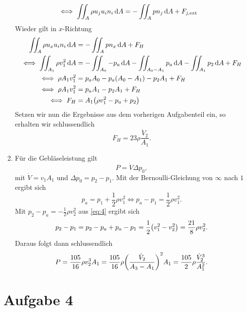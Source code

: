 \documentclass{exercise}
\begin{document}
\begin{enumerate}
\begin{align*}
            \iff \iint_A \rho u_j u_i n_i\mathop{\mathrm{d}\!} A &= -\iint_A pn_j\mathop{\mathrm{d}\!} A + F_{j, \text{ext}}
        \end{align*}
        Wieder gilt in \(x\)-Richtung
        \begin{align*}
            \iint_A \rho u_x u_i n_i\d A &= -\iint_A pn_x\d A + F_H\\
            \iff \iint_{A_1}\rho v_1^2\d A &= -\iint_{A_0}-p_a\d A - \iint_{A_0 - A_1}p_a\d A - \iint_{A_1}p_2\d A + F_H\\
            \iff \rho A_1 v_1^2 &= p_a A_0 - p_a\parentheses*{A_0 - A_1} - p_2 A_1 + F_H\\
            \iff \rho A_1 v_1^2 &= p_a A_1 - p_2 A_1 + F_H\\
            \iff F_H &= A_1\parentheses*{\rho v_1^2 - p_a + p_2}
        \end{align*}
        Setzen wir nun die Ergebnisse aus dem vorherigen Aufgabenteil ein, so erhalten wir schlussendlich
        \[
            F_H = 23\rho\frac{\dot{V}_2}{A_1}.
        \]
        \item Für die Gebläseleistung gilt
        \[
            P = \dot{V}\Delta p_0,
        \]
        mit \(\dot{V} = v_1 A_1\) und \(\Delta p_0 = p_2 - p_1\).
        Mit der Bernoulli-Gleichung von \(\infty\) nach \(1\) ergibt sich
        \[
            p_a = p_1 + \frac{1}{2}\rho v_1^2 \iff p_a - p_1 = \frac{1}{2}\rho v_1^2.
        \]
        Mit \(p_2 - p_a = -\frac{1}{2}\rho v_2^2\) aus \eqref{eq:4} ergibt sich
        \[
            p_2 - p_1 = p_2 - p_a + p_a - p_1 = \frac{1}{2}\parentheses*{v_1^2 - v_2^2} = \frac{21}{8}\rho v_2^2.
        \]
        Daraus folgt dann schlussendlich
        \[
            P = \frac{105}{16}\rho v_2^3 A_1 = \frac{105}{16}\rho\parentheses*{\frac{\dot{V}_2}{A_3 - A_1}}^2 A_1 = \frac{105}{2}\rho\frac{\dot{V}_2^3}{A_1^2}.
        \]
    \end{enumerate}


    \section*{Aufgabe 4}
    
\end{document}
